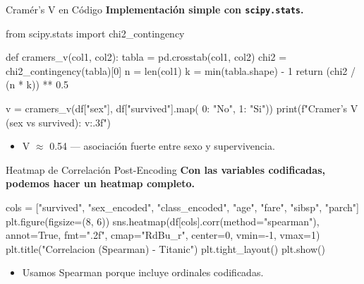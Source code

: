 \documentclass[aspectratio=169, 11pt]{beamer}
\begin{document}
\begin{frame}[fragile,shrink=28]{Cramér's V en Código}
  \vspace{-6pt}
  {\footnotesize\color{arcaDark}\bfseries
    Implementación simple con \texttt{scipy.stats}.}

  \vspace{4pt}
  \begin{pyblock}
from scipy.stats import chi2_contingency

def cramers_v(col1, col2):
    tabla = pd.crosstab(col1, col2)
    chi2 = chi2_contingency(tabla)[0]
    n = len(col1)
    k = min(tabla.shape) - 1
    return (chi2 / (n * k)) ** 0.5

v = cramers_v(df["sex"], df["survived"].map(
    {0: "No", 1: "Si"}))
print(f"Cramer's V (sex vs survived): {v:.3f}")
  \end{pyblock}

  \vspace{4pt}
  {\scriptsize\color{textMuted}
  \begin{itemize}\setlength{\itemsep}{3pt}
    \item[{\color{arcaRed}\scriptsize\faArrowRight}]
      V $\approx$ 0.54 --- asociación fuerte entre sexo y supervivencia.
  \end{itemize}
  }
\end{frame}

\begin{frame}[fragile,shrink=28]{Heatmap de Correlación Post-Encoding}
  \vspace{-6pt}
  {\footnotesize\color{arcaDark}\bfseries
    Con las variables codificadas, podemos hacer un heatmap completo.}

  \vspace{4pt}
  \begin{pyblock}
cols = ["survived", "sex_encoded", "class_encoded",
        "age", "fare", "sibsp", "parch"]
plt.figure(figsize=(8, 6))
sns.heatmap(df[cols].corr(method="spearman"),
            annot=True, fmt=".2f",
            cmap="RdBu_r", center=0, vmin=-1, vmax=1)
plt.title("Correlacion (Spearman) - Titanic")
plt.tight_layout()
plt.show()
  \end{pyblock}

  \vspace{4pt}
  {\scriptsize\color{textMuted}
  \begin{itemize}\setlength{\itemsep}{3pt}
    \item[{\color{arcaRed}\scriptsize\faArrowRight}]
      Usamos Spearman porque incluye ordinales codificadas.
  \end{itemize}
  }
\end{frame}
\end{document}
